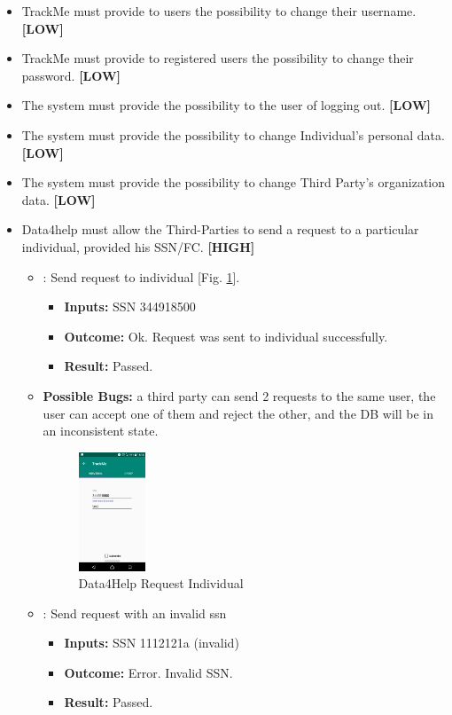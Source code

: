 \documentclass[a4paper, hidelinks, 12pt]{report}
\newcommand\requirement[1]{\item[{[REQ-#1]}] }
\newcommand\test[1]{\item[{[TEST-#1]}] }
\begin{document}
\begin{itemize}
		\requirement{4}TrackMe must provide to users the possibility to change their username. \textbf{[LOW]}
		
		\requirement{5}TrackMe must provide to registered users the possibility to change their password. \textbf{[LOW]}
		\requirement{6}The system must provide the possibility to the user of logging out. \textbf{[LOW]}
		\requirement{7}The system must provide the possibility to change Individual’s personal data. \textbf{[LOW]}
		\requirement{8}The system must provide the possibility to change Third Party’s organization data. \textbf{[LOW]}
		\requirement{9} Data4help must allow the Third-Parties to send a request to a particular individual, provided his SSN/FC.  \textbf{[HIGH]}
		
				\begin{itemize}
		\test{7}: Send request to individual [Fig. \ref{fig:request_individual}].
			\begin{itemize}
			\item \textbf{Inputs: } SSN 344918500			
			\item \textbf{Outcome: } Ok. Request was sent to individual successfully.
			\item \textbf{Result: } Passed. 
			\end{itemize}
			\item{\textbf{Possible Bugs:}} a third party can send 2 requests to the same user, the user can accept one of them and reject the other, and the DB will be in an inconsistent state.
			
		\begin{figure}[H]
					\centering
				\includegraphics[width=0.2\textwidth]{images/request_individual.jpeg}
					\caption[Data4Help Request Individual]{Data4Help Request Individual}
				\label{fig:request_individual}
			\end{figure}
			
		\test{8} : Send request with an invalid ssn
			\begin{itemize}
			\item \textbf{Inputs: } SSN 1112121a (invalid)
			\item \textbf{Outcome: } Error. Invalid SSN.
			\item \textbf{Result: } Passed. 
			 \end{itemize}	
	\end{itemize}
	

\end{itemize}
\end{document}

